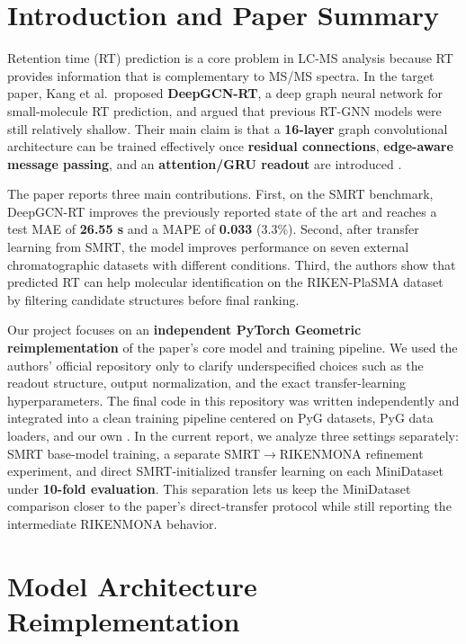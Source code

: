 
\section{Introduction and Paper Summary}

Retention time (RT) prediction is a core problem in LC-MS analysis because RT provides information that is complementary to MS/MS spectra. In the target paper, Kang et al.\ proposed \textbf{DeepGCN-RT}, a deep graph neural network for small-molecule RT prediction, and argued that previous RT-GNN models were still relatively shallow. Their main claim is that a \textbf{16-layer} graph convolutional architecture can be trained effectively once \textbf{residual connections}, \textbf{edge-aware message passing}, and an \textbf{attention/GRU readout} are introduced \cite{kang2023deepgcnrt}.

The paper reports three main contributions. First, on the SMRT benchmark, DeepGCN-RT improves the previously reported state of the art and reaches a test MAE of \textbf{26.55 s} and a MAPE of \textbf{0.033} (3.3\%). Second, after transfer learning from SMRT, the model improves performance on seven external chromatographic datasets with different conditions. Third, the authors show that predicted RT can help molecular identification on the RIKEN-PlaSMA dataset by filtering candidate structures before final ranking.

Our project focuses on an \textbf{independent PyTorch Geometric reimplementation} of the paper's core model and training pipeline. We used the authors' official repository only to clarify underspecified choices such as the readout structure, output normalization, and the exact transfer-learning hyperparameters. The final code in this repository was written independently and integrated into a clean training pipeline centered on PyG datasets, PyG data loaders, and our own . In the current report, we analyze three settings separately: SMRT base-model training, a separate SMRT\(\rightarrow\)RIKENMONA refinement experiment, and direct SMRT-initialized transfer learning on each MiniDataset under \textbf{10-fold evaluation}. This separation lets us keep the MiniDataset comparison closer to the paper's direct-transfer protocol while still reporting the intermediate RIKENMONA behavior.

\section{Model Architecture Reimplementation}

